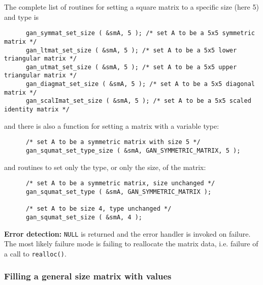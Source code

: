 The complete list of routines for setting a square matrix to a specific size
(here 5) and type is
\begin{verbatim}
      gan_symmat_set_size ( &smA, 5 ); /* set A to be a 5x5 symmetric matrix */
      gan_ltmat_set_size ( &smA, 5 ); /* set A to be a 5x5 lower triangular matrix */
      gan_utmat_set_size ( &smA, 5 ); /* set A to be a 5x5 upper triangular matrix */
      gan_diagmat_set_size ( &smA, 5 ); /* set A to be a 5x5 diagonal matrix */
      gan_scalImat_set_size ( &smA, 5 ); /* set A to be a 5x5 scaled identity matrix */
\end{verbatim}
and there is also a function for setting a matrix with a variable type:
\begin{verbatim}
      /* set A to be a symmetric matrix with size 5 */
      gan_squmat_set_type_size ( &smA, GAN_SYMMETRIC_MATRIX, 5 );
\end{verbatim}
and routines to set only the type, or only the size, of the matrix:
\begin{verbatim}
      /* set A to be a symmetric matrix, size unchanged */
      gan_squmat_set_type ( &smA, GAN_SYMMETRIC_MATRIX );

      /* set A to be size 4, type unchanged */
      gan_squmat_set_size ( &smA, 4 );
\end{verbatim}

{\bf Error detection:} {\tt NULL} is returned and the error handler is
invoked on failure. The most likely failure mode is failing to reallocate
the matrix data, i.e. failure of a call to {\tt realloc()}.

\subsubsection{Filling a general size matrix with values}
   \label{fill-mat-gen-sec}

